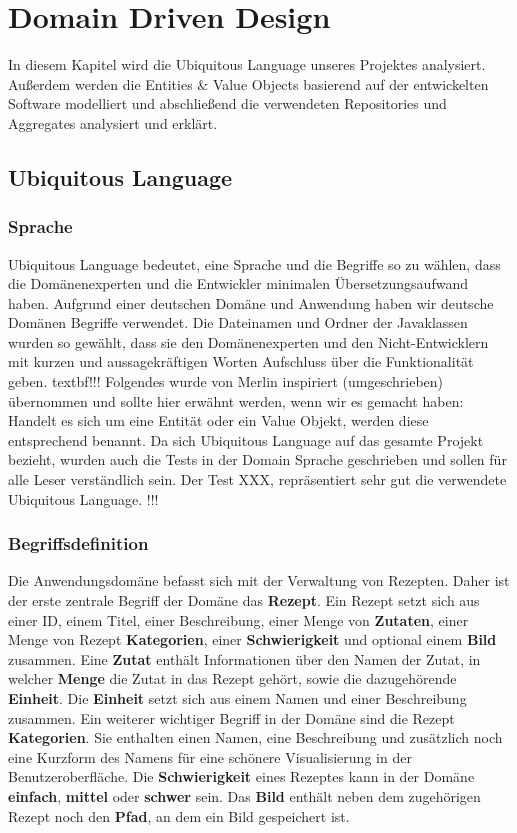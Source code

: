 \chapter{Domain Driven Design}
In diesem Kapitel wird die Ubiquitous Language unseres Projektes analysiert. Außerdem werden die Entities \& Value Objects basierend auf der entwickelten Software modelliert und abschließend die verwendeten Repositories und Aggregates analysiert und erklärt.
\section{Ubiquitous Language}
\subsection{Sprache}
Ubiquitous Language  bedeutet, eine Sprache und die Begriffe so zu wählen, dass die Domänenexperten und die Entwickler minimalen Übersetzungsaufwand haben.  Aufgrund einer deutschen Domäne und Anwendung haben wir deutsche Domänen Begriffe verwendet.
Die Dateinamen und Ordner der Javaklassen wurden so gewählt, dass sie den Domänenexperten und den Nicht-Entwicklern mit kurzen und aussagekräftigen Worten Aufschluss über die Funktionalität geben. textbf{!!! Folgendes wurde von Merlin inspiriert (umgeschrieben) übernommen und sollte hier erwähnt werden, wenn wir es gemacht haben: Handelt es sich um eine Entität oder ein Value Objekt, werden diese entsprechend benannt.
Da sich Ubiquitous Language  auf das gesamte Projekt bezieht, wurden auch die Tests in der Domain Sprache geschrieben und sollen für alle Leser verständlich sein. Der Test XXX, repräsentiert sehr gut die verwendete Ubiquitous Language. !!!}
\subsection{Begriffsdefinition}
Die Anwendungsdomäne befasst sich mit der Verwaltung von Rezepten. Daher ist der erste zentrale Begriff der Domäne das \textbf{Rezept}. Ein Rezept setzt sich aus einer ID, einem Titel, einer Beschreibung, einer Menge von \textbf{Zutaten}, einer Menge von Rezept \textbf{Kategorien}, einer \textbf{Schwierigkeit} und optional einem \textbf{Bild} zusammen. Eine \textbf{Zutat} enthält Informationen über den Namen der Zutat, in welcher \textbf{Menge} die Zutat in das Rezept gehört, sowie die dazugehörende \textbf{Einheit}. Die \textbf{Einheit} setzt sich aus einem Namen und einer Beschreibung zusammen.
Ein weiterer wichtiger Begriff in der Domäne sind die Rezept \textbf{Kategorien}. Sie enthalten einen Namen, eine Beschreibung und zusätzlich noch eine Kurzform des Namens für eine schönere Visualisierung in der Benutzeroberfläche.
Die \textbf{Schwierigkeit} eines Rezeptes kann in der Domäne \textbf{einfach}, \textbf{mittel} oder \textbf{schwer} sein. Das \textbf{Bild} enthält neben dem zugehörigen Rezept noch den \textbf{Pfad}, an dem ein Bild gespeichert ist.
